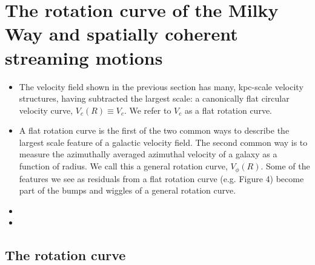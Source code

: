 \section{The rotation curve of the Milky Way and spatially coherent streaming motions}

\begin{itemize}
\item{The velocity field shown in the previous section has many, kpc-scale velocity structures, having subtracted the largest scale: a canonically flat circular velocity curve, $V_c\left(R\right) \equiv V_c$. We refer to $V_c$ as a flat rotation curve.}
\item{A flat rotation curve is the first of the two common ways to describe the largest scale feature of a galactic velocity field. The second common way is to measure the azimuthally averaged azimuthal velocity of a galaxy as a function of radius. We call this a general rotation curve, $V_\phi\left(R\right)$. Some of the features we see as residuals from a flat rotation curve (e.g. Figure 4) become part of the bumps and wiggles of a general rotation curve. }
\item{}
\item{}
\end{itemize}

\label{sec:rotation_curve}

\subsection{The rotation curve}
\label{sec:rotation_fit}

